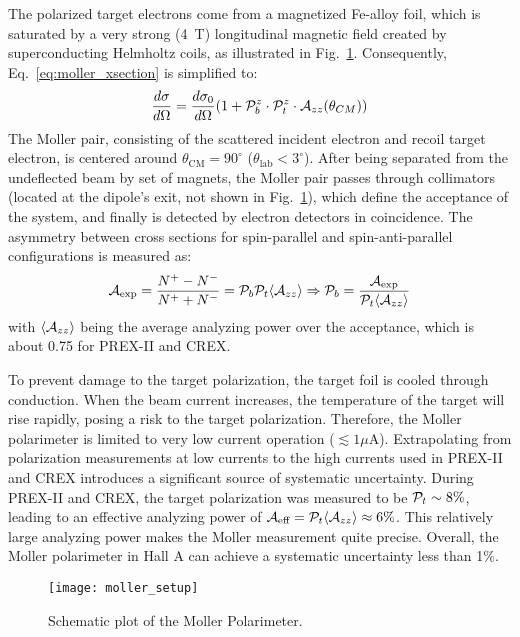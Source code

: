 The polarized target electrons come from a magnetized Fe-alloy foil, which is 
saturated by a very strong (4~T) longitudinal magnetic field created by 
superconducting Helmholtz coils, as illustrated in Fig.~\ref{fig:moller_polarimeter}. 
Consequently, Eq.~\ref{eq:moller_xsection} is simplified to:
\begin{equation}
    \frac{d\sigma}{d\Omega} = \frac{d\sigma_0}{d\Omega} ( 1 + \mathcal{P}_b^z \cdot \mathcal{P}_t^z \cdot \mathcal{A}_{zz}(\theta_{CM}))
    \label{eq:moller_xsection_1}
\end{equation}
The Moller pair, consisting of the scattered incident electron and recoil target electron,
is centered around $\theta_{\text{CM}} = 90^\circ$ ($\theta_{\text{lab}} < 3^\circ$). 
After being separated from the undeflected beam by set of magnets, the Moller
pair passes through collimators (located at the dipole's exit, not shown in 
Fig.~\ref{fig:moller_polarimeter}), which define the acceptance of the system, 
and finally is detected by electron detectors in coincidence.
The asymmetry between cross sections for spin-parallel and spin-anti-parallel 
configurations is measured as:
\begin{equation}
    \mathcal{A}_{\text{exp}} = \frac{N^+ - N^-}{N^+ + N^-} = \mathcal{P}_b \mathcal{P}_t \langle \mathcal{A}_{zz} \rangle 
    \Rightarrow
    \mathcal{P}_b = \frac{\mathcal{A}_{\text{exp}}}{\mathcal{P}_t \langle \mathcal{A}_{zz} \rangle}
\end{equation}
with $\langle \mathcal{A}_{zz} \rangle$ being the average analyzing power over the acceptance,
which is about 0.75 for PREX-II and CREX.

To prevent damage to the target polarization, the target foil is cooled through 
conduction. When the beam current increases, the temperature of the target will
rise rapidly, posing a risk to the target polarization. Therefore, the Moller 
polarimeter is limited to very low current operation ($\lesssim 1\mu$A).
Extrapolating from polarization measurements at low currents to the high currents
used in PREX-II and CREX introduces a significant source of systematic uncertainty.
During PREX-II and CREX, the target polarization was measured to be $\mathcal{P}_t \sim 8\%$,
leading to an effective analyzing power of $\mathcal{A}_{\text{eff}} = \mathcal{P}_t\langle \mathcal{A}_{zz} \rangle \approx 6\%$.
This relatively large analyzing power makes the Moller measurement quite precise.
Overall, the Moller polarimeter in Hall A can achieve a systematic uncertainty less
than 1\%.

\begin{figure}[!h]
    \centering
    \texttt{[image: moller\_setup]}
    \caption{Schematic plot of the Moller Polarimeter.}
    \label{fig:moller_polarimeter}
\end{figure}

